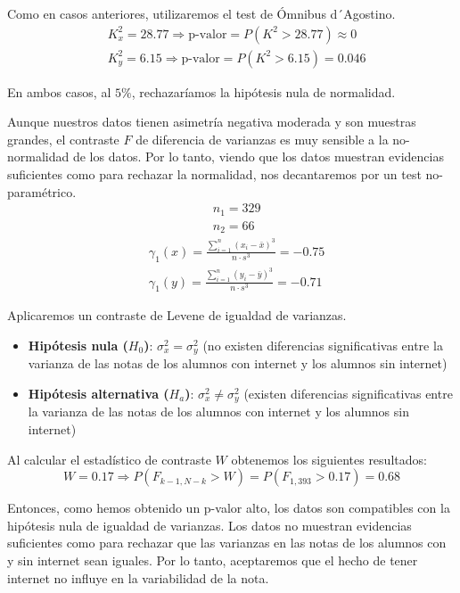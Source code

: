 Como en casos anteriores, utilizaremos el test de Ómnibus d´Agostino.
\begin{equation*}
    \begin{split}
        & K_{x}^2 = 28.77 \Rightarrow \text{p-valor} = P(K^2 > 28.77) \approx 0\\
        & K_{y}^2 = 6.15 \Rightarrow \text{p-valor} = P(K^2 > 6.15) = 0.046
    \end{split}
\end{equation*}

En ambos casos, al $5 \%$, rechazaríamos la hipótesis nula de normalidad.

Aunque nuestros datos tienen asimetría negativa moderada y son muestras grandes, el contraste $F$ de diferencia de varianzas es muy sensible a la no-normalidad de los datos. Por lo tanto, viendo que los datos muestran evidencias suficientes como para rechazar la normalidad, nos decantaremos por un test no-paramétrico.
\begin{equation*}
    \begin{split}
        & n_{1} = 329\\
        & n_{2} = 66
    \end{split}
\end{equation*}
\begin{equation*}
    \begin{split}
        & \gamma_{1}(x) = \frac{\sum_{i=1}^{n}(x_i - \bar{x})^3}{n \cdot s^3} = -0.75\\
        & \gamma_{1}(y) = \frac{\sum_{i=1}^{n}(y_i - \bar{y})^3}{n \cdot s^3} = -0.71
    \end{split} 
\end{equation*}

Aplicaremos un contraste de Levene de igualdad de varianzas.

\begin{itemize}
    \item \textbf{Hipótesis nula ($H_0$)}: $\sigma_{x}^2 = \sigma_{y}^2$ (no existen diferencias significativas entre la varianza de las notas de los alumnos con internet y los alumnos sin internet)
    \item \textbf{Hipótesis alternativa ($H_a$)}: $\sigma_{x}^2 \neq \sigma_{y}^2$ (existen diferencias significativas entre la varianza de las notas de los alumnos con internet y los alumnos sin internet)
\end{itemize}

Al calcular el estadístico de contraste $W$ obtenemos los siguientes resultados:
\begin{equation*}
    W = 0.17 \Rightarrow P(F_{k-1,N-k} > W) = P(F_{1, 393} > 0.17) = 0.68
\end{equation*}

Entonces, como hemos obtenido un p-valor alto, los datos son compatibles con la hipótesis nula de igualdad de varianzas. Los datos no muestran evidencias suficientes como para rechazar que las varianzas en las notas de los alumnos con y sin internet sean iguales. Por lo tanto, aceptaremos que el hecho de tener internet no influye en la variabilidad de la nota.
